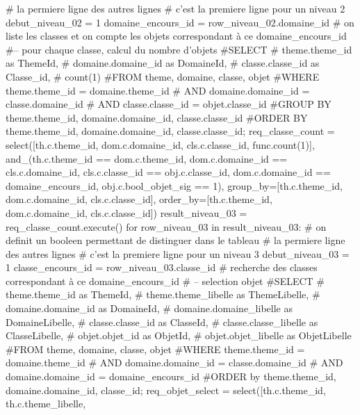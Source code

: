 \documentclass[12pt,titlepage]{book}
\begin{document}
\begin{lbdpython}
      # la permiere ligne des autres lignes
      # c'est la premiere ligne pour un niveau 2
      debut_niveau_02 = 1
      domaine_encours_id = row_niveau_02.domaine_id
      # on liste les classes et on compte les objets correspondant à ce domaine_encours_id
      #-- pour chaque classe, calcul du nombre d'objets
      #SELECT
      #   theme.theme_id as ThemeId,
      #   domaine.domaine_id as DomaineId,
      #   classe.classe_id as Classe_id,
      #   count(1)
      #FROM theme, domaine, classe, objet
      #WHERE theme.theme_id = domaine.theme_id 
      #  AND domaine.domaine_id = classe.domaine_id
      #  AND classe.classe_id = objet.classe_id
      #GROUP BY theme.theme_id, domaine.domaine_id, classe.classe_id
      #ORDER BY theme.theme_id, domaine.domaine_id, classe.classe_id;
      req_classe_count = select([th.c.theme_id, dom.c.domaine_id,
                                 cls.c.classe_id, func.count(1)],
                         and_(th.c.theme_id == dom.c.theme_id,
                              dom.c.domaine_id == cls.c.domaine_id,
                              cls.c.classe_id == obj.c.classe_id,
                              dom.c.domaine_id == domaine_encours_id,
                              obj.c.bool_objet_sig == 1),
                         group_by=[th.c.theme_id, dom.c.domaine_id, cls.c.classe_id],
                         order_by=[th.c.theme_id, dom.c.domaine_id, cls.c.classe_id])
      result_niveau_03 = req_classe_count.execute()
      for row_niveau_03 in result_niveau_03:
         # on definit un booleen permettant de distinguer dans le tableau
         # la permiere ligne des autres lignes
         # c'est la premiere ligne pour un niveau 3
         debut_niveau_03 = 1
         classe_encours_id = row_niveau_03.classe_id
         # recherche des classes correspondant à ce domaine_encours_id
         # -- selection objet
         #SELECT
         #   theme.theme_id as ThemeId,
         #   theme.theme_libelle as ThemeLibelle,
         #   domaine.domaine_id as DomaineId,
         #   domaine.domaine_libelle as DomaineLibelle,
         #   classe.classe_id as ClasseId,
         #   classe.classe_libelle as ClasseLibelle,
         #   objet.objet_id as ObjetId,
         #   objet.objet_libelle as ObjetLibelle
         #FROM theme, domaine, classe, objet
         #WHERE theme.theme_id = domaine.theme_id
         #  AND domaine.domaine_id = classe.domaine_id
         #  AND domaine.domaine_id = domaine_encours_id
         #ORDER by theme.theme_id, domaine.domaine_id, classe_id;
         req_objet_select = select([th.c.theme_id, th.c.theme_libelle,

\end{lbdpython}
\end{document}
